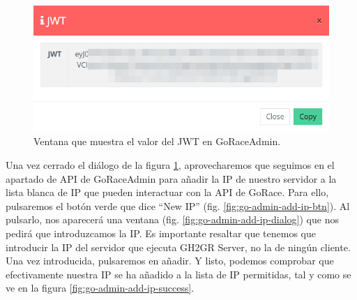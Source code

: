 \begin{figure}
    \centering
    \includegraphics[width=0.5\linewidth]{go-admin-add-jwt-value.png}
    \caption{Ventana que muestra el valor del JWT en GoRaceAdmin.}
    \label{fig:go-admin-add-jwt-value}
\end{figure}

Una vez cerrado el diálogo de la figura \ref{fig:go-admin-add-jwt-value}, aprovecharemos que seguimos en el apartado de \acrshort{API} de GoRaceAdmin para añadir la IP de nuestro servidor a la lista blanca de IP que pueden interactuar con la \acrshort{API} de GoRace. Para ello, pulsaremos el botón verde que dice ``New IP'' (fig. \ref{fig:go-admin-add-ip-btn}). Al pulsarlo, nos aparecerá una ventana (fig. \ref{fig:go-admin-add-ip-dialog}) que nos pedirá que introduzcamos la IP. Es importante resaltar que tenemos que introducir la IP del servidor que ejecuta GH2GR Server, no la de ningún cliente. Una vez introducida, pulsaremos en añadir. Y listo, podemos comprobar que efectivamente nuestra IP se ha añadido a la lista de IP permitidas, tal y como se ve en la figura \ref{fig:go-admin-add-ip-success}.

